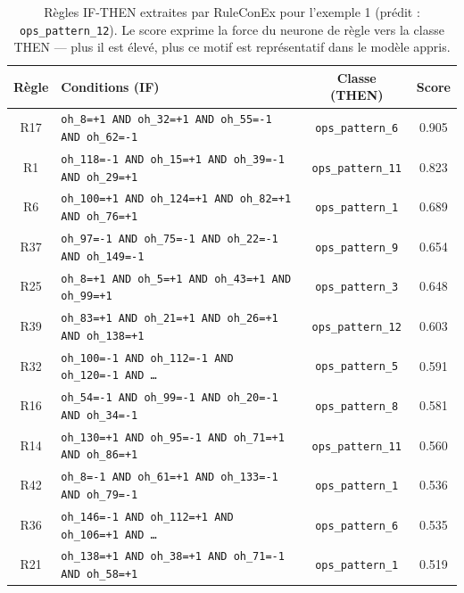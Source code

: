 \documentclass[12pt,a4paper]{article}
\begin{document}
\begin{table}[htbp]
  \centering
  \caption{Règles IF-THEN extraites par RuleConEx pour l'exemple 1
           (prédit : \texttt{ops\_pattern\_12}). Le score exprime la force
           du neurone de règle vers la classe THEN — plus il est élevé,
           plus ce motif est représentatif dans le modèle appris.}
  \label{tab:regles_ex1}
  \small
  \setlength{\tabcolsep}{4pt}
  \begin{tabular}{clcc}
    \toprule
    \textbf{Règle} & \textbf{Conditions (IF)} & \textbf{Classe (THEN)} & \textbf{Score} \\
    \midrule
    R17 & \texttt{oh\_8=+1 AND oh\_32=+1 AND oh\_55=-1 AND oh\_62=-1}    & \texttt{ops\_pattern\_6}  & 0.905 \\
    R1  & \texttt{oh\_118=-1 AND oh\_15=+1 AND oh\_39=-1 AND oh\_29=+1}  & \texttt{ops\_pattern\_11} & 0.823 \\
    R6  & \texttt{oh\_100=+1 AND oh\_124=+1 AND oh\_82=+1 AND oh\_76=+1} & \texttt{ops\_pattern\_1}  & 0.689 \\
    R37 & \texttt{oh\_97=-1 AND oh\_75=-1 AND oh\_22=-1 AND oh\_149=-1}  & \texttt{ops\_pattern\_9}  & 0.654 \\
    R25 & \texttt{oh\_8=+1 AND oh\_5=+1 AND oh\_43=+1 AND oh\_99=+1}    & \texttt{ops\_pattern\_3}  & 0.648 \\
    R39 & \texttt{oh\_83=+1 AND oh\_21=+1 AND oh\_26=+1 AND oh\_138=+1} & \texttt{ops\_pattern\_12} & 0.603 \\
    R32 & \texttt{oh\_100=-1 AND oh\_112=-1 AND oh\_120=-1 AND \ldots}   & \texttt{ops\_pattern\_5}  & 0.591 \\
    R16 & \texttt{oh\_54=-1 AND oh\_99=-1 AND oh\_20=-1 AND oh\_34=-1}  & \texttt{ops\_pattern\_8}  & 0.581 \\
    R14 & \texttt{oh\_130=+1 AND oh\_95=-1 AND oh\_71=+1 AND oh\_86=+1} & \texttt{ops\_pattern\_11} & 0.560 \\
    R42 & \texttt{oh\_8=-1 AND oh\_61=+1 AND oh\_133=-1 AND oh\_79=-1}  & \texttt{ops\_pattern\_1}  & 0.536 \\
    R36 & \texttt{oh\_146=-1 AND oh\_112=+1 AND oh\_106=+1 AND \ldots}  & \texttt{ops\_pattern\_6}  & 0.535 \\
    R21 & \texttt{oh\_138=+1 AND oh\_38=+1 AND oh\_71=-1 AND oh\_58=+1} & \texttt{ops\_pattern\_1}  & 0.519 \\
    \bottomrule
  \end{tabular}
\end{table}
\end{document}
